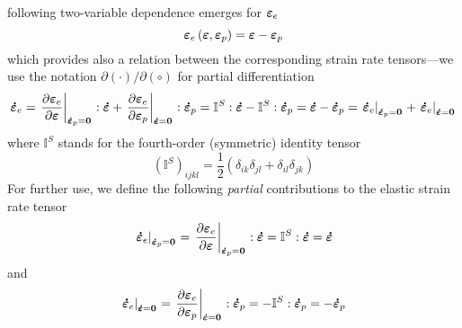 \documentclass[preprint,review,12pt,sort&compress]{elsarticle}%
\newcommand{\epspdo}[0]{\scriptsize\mathbf{\dot \varepsilon}_p = \mathbf{0}\normalsize\mathbf{}}
\newcommand{\epsdo}[0]{\scriptsize\mathbf{\dot \varepsilon} = \mathbf{0}\normalsize\mathbf{}}
\renewcommand{\mathbf}[1]{\mbox{\boldmath $#1$ \unboldmath}  \!\!}
\begin{document}
following two-variable dependence emerges for $\mathbf{\varepsilon}_{e}$%
\begin{equation}
\mathbf{\varepsilon}_{e}\left(  \mathbf{\varepsilon},\mathbf{\varepsilon}%
_{p}\right)  =\mathbf{\varepsilon}-\mathbf{\varepsilon}_{p}
\label{epse dependence 0}%
\end{equation}
which provides also a relation between the corresponding strain rate
tensors---we use the notation $\partial\left(  \cdot\right)  /\partial(\circ)$
for partial differentiation%
\begin{equation}
\mathbf{\dot{\varepsilon}}_{e}=\left.  \frac{\partial\mathbf{\varepsilon}_{e}%
}{\partial\mathbf{\varepsilon}}\right\vert _{%
\epspdo
}:\mathbf{\dot{\varepsilon}}+\left.  \frac{\partial\mathbf{\varepsilon}_{e}%
}{\partial\mathbf{\varepsilon}_{p}}\right\vert _{%
\epsdo
}:\mathbf{\dot{\varepsilon}}_{p}=\mathbb{I}^{S}:\mathbf{\dot{\varepsilon}%
}-\mathbb{I}^{S}:\mathbf{\dot{\varepsilon}}_{p}=\mathbf{\dot{\varepsilon}%
}-\mathbf{\dot{\varepsilon}}_{p}=\left.  \mathbf{\dot{\varepsilon}}%
_{e}\right\vert _{%
\epspdo
}+\left.  \mathbf{\dot{\varepsilon}}_{e}\right\vert _{%
\epsdo
} \label{epsedot}%
\end{equation}
where $\mathbb{I}^{S}$ stands for the fourth-order (symmetric) identity tensor%
\begin{equation}
(\mathbb{I}^{S})_{ijkl}=\frac{1}{2}\left(  \delta_{ik}\delta_{jl}+\delta
_{il}\delta_{jk}\right)
\end{equation}
For further use, we define the following \emph{partial} contributions to the
elastic strain rate tensor%
\begin{equation}
\left.  \mathbf{\dot{\varepsilon}}_{e}\right\vert _{%
\epspdo
}=\left.  \frac{\partial\mathbf{\varepsilon}_{e}}{\partial\mathbf{\varepsilon
}}\right\vert _{%
\epspdo
}:\mathbf{\dot{\varepsilon}}=\mathbb{I}^{S}:\mathbf{\dot{\varepsilon}%
}=\mathbf{\dot{\varepsilon}} \label{epsedot with epspdot0}%
\end{equation}
and%
\begin{equation}
\left.  \mathbf{\dot{\varepsilon}}_{e}\right\vert _{%
\epsdo
}=\left.  \frac{\partial\mathbf{\varepsilon}_{e}}{\partial\mathbf{\varepsilon
}_{p}}\right\vert _{%
\epsdo
}:\mathbf{\dot{\varepsilon}}_{p}=-\mathbb{I}^{S}:\mathbf{\dot{\varepsilon}%
}_{p}=-\mathbf{\dot{\varepsilon}}_{p} \label{epsedot with epsdot0}%
\end{equation}
\end{document}

